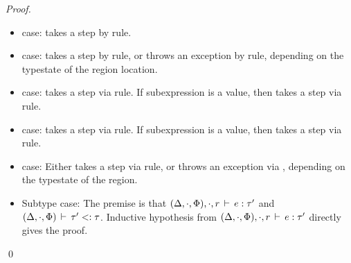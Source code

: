 \begin{proof}
\begin{itemize}
  \item {} case: takes a step by 
  rule.

  \item {} case: takes a step by  rule, or throws an
  exception by  rule, depending on the typestate
  of the region location.

  \item {} case: takes a step via  rule.  If
  subexpression is a value, then  takes a step via
   rule.

  \item {} case: takes a step via  rule.  If
  subexpression is a value, then  takes a step via
   rule.

  \item {} case: Either takes a step via 
  rule, or throws an exception via , depending
  on the typestate of the region.

  \item Subtype case: The premise is that
  $(\Delta,\cdot,\Phi),\cdot,r\,\vdash\,e:\tau'$ and 
  $(\Delta,\cdot,\Phi)\,\vdash\,\tau' <: \tau$. Inductive hypothesis
  from $(\Delta,\cdot,\Phi),\cdot,r\,\vdash\,e:\tau'$ directly
  gives the proof.

\end{itemize}
\qed
\end{proof}

